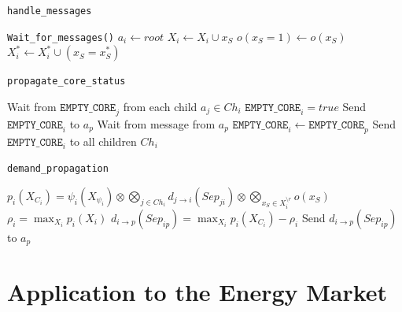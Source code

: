 \documentclass[11pt, twoside, titlepage, a4paper, openright]{report}
\begin{document}
\begin{algorithm}[!tb]
\caption{\texttt{handle\_messages	}} 
\begin{algorithmic}
\State \texttt{Wait\_for\_messages()}
\State $a_i \gets root$
\EndIf
{}
\State $X_i \leftarrow X_i \cup x_S$
\State $o(x_S=1)\leftarrow o(x_S)$ 
\State $X^{*}_i \leftarrow X^{*}_i \cup (x_S=x^*_S)$ 
\EndFor
\EndIf
\EndFor
\end{algorithmic}
\end{algorithm}

\begin{algorithm}[!tb]
\caption{\texttt{propagate\_core\_status}} 
\begin{algorithmic}
\State Wait from $\texttt{EMPTY\_CORE}_j$ from each child $a_j\in Ch_i$
\State $\texttt{EMPTY\_CORE}_i=true$
\EndIf
{}
\State Send $\texttt{EMPTY\_CORE}_i$ to $a_p$
\State Wait from message from $a_p$
\State $\texttt{EMPTY\_CORE}_i\gets\texttt{EMPTY\_CORE}_p$
\EndIf
\State Send $\texttt{EMPTY\_CORE}_i$ to all children $Ch_i$
\end{algorithmic}
\end{algorithm}

\begin{algorithm}[!tb]
\caption{\texttt{demand\_propagation}} 
\begin{algorithmic}
\State $p_i(X_{C_i}) = \psi_i(X_{\psi_i}) \otimes \bigotimes_{j \in Ch_i} d_{j \rightarrow i}(Sep_{ji})\otimes \bigotimes_{x_S \in X^{\setminus r}_i}o(x_S)$ 
\State $\rho_i = \max_{X_{i}} p_i(X_{i})$
\State $d_{i \rightarrow p}(Sep_{ip})= \max_{X_i} p_i(X_{C_i}) - \rho_i$ 
\State Send $d_{i\rightarrow p}(Sep_{ip})$ to $a_p$
\EndIf
\end{algorithmic}
\end{algorithm}


\chapter{Application to the Energy Market}\label{chap:energy}
\end{document}
